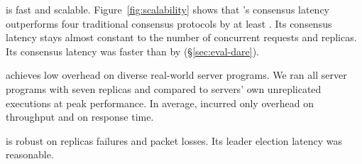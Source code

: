 \begin{tightenum}

\item \xxx is fast and scalable. Figure~\ref{fig:scalability} shows that \xxx's 
consensus latency outperforms four traditional consensus protocols by at least
\comptradlow. Its consensus latency stays almost constant to the number 
of concurrent requests and replicas. Its consensus latency was faster than 
\dare by \fasterDARE (\S\ref{sec:eval-dare}).



\item \xxx achieves low overhead on diverse real-world server programs. We ran 
all \nprog server programs with seven replicas and compared to servers' own 
unreplicated executions at peak performance. In average, \xxx incurred only 
\tputoverhead overhead on throughput and \latencyoverhead on response time.
 
\item \xxx is robust on replicas failures and packet losses. Its leader 
election latency was reasonable.



\end{tightenum}







